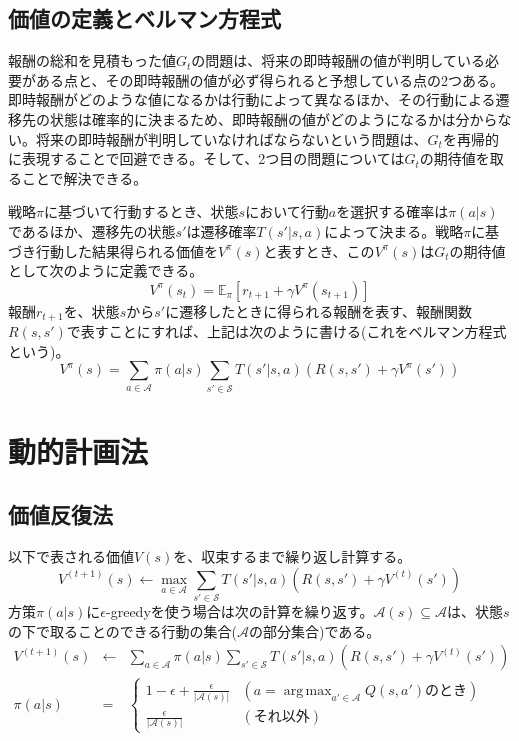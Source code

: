 \documentclass[dvipdfmx]{jsarticle}
\DeclareMathOperator*{\argmax}{arg\,max}
\begin{document}
\subsection{価値の定義とベルマン方程式}
報酬の総和を見積もった値$G_t$の問題は、将来の即時報酬の値が判明している必要がある点と、その即時報酬の値が必ず得られると予想している点の2つある。即時報酬がどのような値になるかは行動によって異なるほか、その行動による遷移先の状態は確率的に決まるため、即時報酬の値がどのようになるかは分からない。将来の即時報酬が判明していなければならないという問題は、$G_t$を再帰的に表現することで回避できる。そして、2つ目の問題については$G_t$の期待値を取ることで解決できる。

戦略$\pi$に基づいて行動するとき、状態$s$において行動$a$を選択する確率は$\pi(a | s)$であるほか、遷移先の状態$s'$は遷移確率$T(s' | s, a)$によって決まる。戦略$\pi$に基づき行動した結果得られる価値を$V^\pi(s)$と表すとき、この$V^\pi(s)$は$G_t$の期待値として次のように定義できる。
\begin{equation}
	V^\pi(s_t) = \mathbb{E}_\pi \left[ r_{t + 1} + \gamma V^\pi(s_{t + 1}) \right]
\end{equation}
報酬$r_{t + 1}$を、状態$s$から$s'$に遷移したときに得られる報酬を表す、報酬関数$R(s, s')$で表すことにすれば、上記は次のように書ける(これをベルマン方程式という)。
\begin{equation}
	V^\pi(s) = \sum_{a \in \mathcal{A}} \pi(a | s) \sum_{s' \in \mathcal{S}} T(s' | s, a) \left( R(s, s') + \gamma V^\pi(s') \right)
\end{equation}

\section{動的計画法}

\subsection{価値反復法}
以下で表される価値$V(s)$を、収束するまで繰り返し計算する。
\begin{equation}
	V^{(t + 1)}(s) \leftarrow \max_{a \in \mathcal{A}} \sum_{s' \in \mathcal{S}} T(s' | s, a) \left( R(s, s') + \gamma V^{(t)}(s') \right)
\end{equation}
方策$\pi(a | s)$に$\epsilon$-greedyを使う場合は次の計算を繰り返す。$\mathcal{A}(s) \subseteq \mathcal{A}$は、状態$s$の下で取ることのできる行動の集合($\mathcal{A}$の部分集合)である。
\begin{eqnarray}
	V^{(t + 1)}(s) &\leftarrow& \sum_{a \in \mathcal{A}} \pi(a | s) \sum_{s' \in \mathcal{S}} T(s' | s, a) \left( R(s, s') + \gamma V^{(t)}(s') \right) \\
	\pi(a | s) &=& \left\{ \begin{array}{ll} 1 - \epsilon + \frac{\epsilon}{|\mathcal{A}(s)|} & (a = \argmax_{a' \in \mathcal{A}} Q(s, a')のとき) \\ \frac{\epsilon}{|\mathcal{A}(s)|} & (それ以外) \end{array} \right.
\end{eqnarray}
\end{document}
